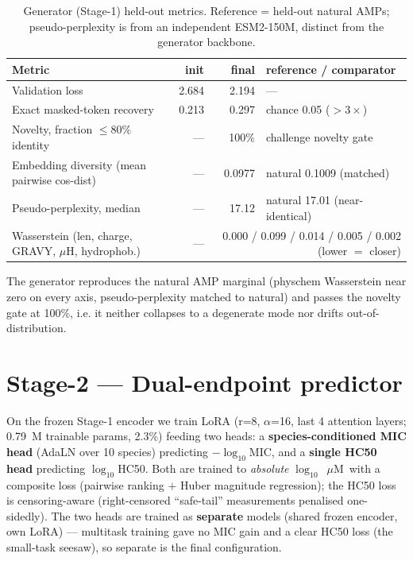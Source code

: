 \documentclass[11pt]{article}
\newcommand{\uM}{\ensuremath{\mu}M}
\begin{document}
\begin{table}[h]\centering\small
\caption{Generator (Stage-1) held-out metrics. Reference = held-out natural AMPs; pseudo-perplexity
is from an independent ESM2-150M, distinct from the generator backbone.}
\setlength{\tabcolsep}{5pt}
\begin{tabular}{@{}p{5.6cm}rrp{4.2cm}@{}}
\toprule
\textbf{Metric} & \textbf{init} & \textbf{final} & \textbf{reference / comparator} \\
\midrule
Validation loss                         & 2.684 & 2.194 & --- \\
Exact masked-token recovery             & 0.213 & 0.297 & chance 0.05 ($>3\times$) \\
Novelty, fraction $\le 80\%$ identity   & ---   & 100\% & challenge novelty gate \\
Embedding diversity (mean pairwise cos-dist) & --- & 0.0977 & natural 0.1009 (matched) \\
Pseudo-perplexity, median               & ---   & 17.12 & natural 17.01 (near-identical) \\
Wasserstein (len, charge, GRAVY, $\mu$H, hydrophob.) & --- & \multicolumn{2}{p{5.2cm}}{0.000 / 0.099 / 0.014 / 0.005 / 0.002 (lower $=$ closer)} \\
\bottomrule
\end{tabular}
\end{table}

The generator reproduces the natural AMP marginal (physchem Wasserstein near zero on every axis,
pseudo-perplexity matched to natural) and passes the novelty gate at 100\%, i.e. it neither collapses
to a degenerate mode nor drifts out-of-distribution.

\section{Stage-2 --- Dual-endpoint predictor}

On the frozen Stage-1 encoder we train LoRA (r=8, $\alpha$=16, last 4 attention layers; 0.79~M
trainable params, 2.3\%) feeding two heads: a \textbf{species-conditioned MIC head} (AdaLN over 10
species) predicting $-\log_{10}$MIC, and a \textbf{single HC50 head} predicting $\log_{10}$HC50.
Both are trained to \emph{absolute} $\log_{10}$~\uM\ with a composite loss (pairwise ranking $+$
Huber magnitude regression); the HC50 loss is censoring-aware (right-censored ``safe-tail''
measurements penalised one-sidedly). The two heads are trained as \textbf{separate} models
(shared frozen encoder, own LoRA) --- multitask training gave no MIC gain and a clear HC50 loss
(the small-task seesaw), so separate is the final configuration.
\end{document}
